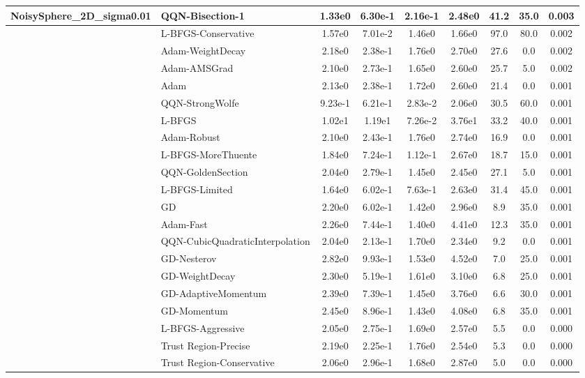 \documentclass{article}
\begin{document}
\begin{longtable}{|l|l|c|c|c|c|c|c|c|}
NoisySphere\_2D\_sigma0.01 & \textbf{QQN-Bisection-1} & 1.33e0 & 6.30e-1 & 2.16e-1 & 2.48e0 & 41.2 & 35.0 & 0.003 \\
\hline
 & L-BFGS-Conservative & 1.57e0 & 7.01e-2 & 1.46e0 & 1.66e0 & 97.0 & 80.0 & 0.002 \\
\hline
 & Adam-WeightDecay & 2.18e0 & 2.38e-1 & 1.76e0 & 2.70e0 & 27.6 & 0.0 & 0.002 \\
\hline
 & Adam-AMSGrad & 2.10e0 & 2.73e-1 & 1.65e0 & 2.60e0 & 25.7 & 5.0 & 0.002 \\
\hline
 & Adam & 2.13e0 & 2.38e-1 & 1.72e0 & 2.60e0 & 21.4 & 0.0 & 0.001 \\
\hline
 & QQN-StrongWolfe & 9.23e-1 & 6.21e-1 & 2.83e-2 & 2.06e0 & 30.5 & 60.0 & 0.001 \\
\hline
 & L-BFGS & 1.02e1 & 1.19e1 & 7.26e-2 & 3.76e1 & 33.2 & 40.0 & 0.001 \\
\hline
 & Adam-Robust & 2.10e0 & 2.43e-1 & 1.76e0 & 2.74e0 & 16.9 & 0.0 & 0.001 \\
\hline
 & L-BFGS-MoreThuente & 1.84e0 & 7.24e-1 & 1.12e-1 & 2.67e0 & 18.7 & 15.0 & 0.001 \\
\hline
 & QQN-GoldenSection & 2.04e0 & 2.79e-1 & 1.45e0 & 2.45e0 & 27.1 & 5.0 & 0.001 \\
\hline
 & L-BFGS-Limited & 1.64e0 & 6.02e-1 & 7.63e-1 & 2.63e0 & 31.4 & 45.0 & 0.001 \\
\hline
 & GD & 2.20e0 & 6.02e-1 & 1.42e0 & 2.96e0 & 8.9 & 35.0 & 0.001 \\
\hline
 & Adam-Fast & 2.26e0 & 7.44e-1 & 1.40e0 & 4.41e0 & 12.3 & 35.0 & 0.001 \\
\hline
 & QQN-CubicQuadraticInterpolation & 2.04e0 & 2.13e-1 & 1.70e0 & 2.34e0 & 9.2 & 0.0 & 0.001 \\
\hline
 & GD-Nesterov & 2.82e0 & 9.93e-1 & 1.53e0 & 4.52e0 & 7.0 & 25.0 & 0.001 \\
\hline
 & GD-WeightDecay & 2.30e0 & 5.19e-1 & 1.61e0 & 3.10e0 & 6.8 & 25.0 & 0.001 \\
\hline
 & GD-AdaptiveMomentum & 2.39e0 & 7.39e-1 & 1.45e0 & 3.76e0 & 6.6 & 30.0 & 0.001 \\
\hline
 & GD-Momentum & 2.45e0 & 8.96e-1 & 1.43e0 & 4.08e0 & 6.8 & 35.0 & 0.001 \\
\hline
 & L-BFGS-Aggressive & 2.05e0 & 2.75e-1 & 1.69e0 & 2.57e0 & 5.5 & 0.0 & 0.000 \\
\hline
 & Trust Region-Precise & 2.19e0 & 2.25e-1 & 1.76e0 & 2.54e0 & 5.3 & 0.0 & 0.000 \\
\hline
 & Trust Region-Conservative & 2.06e0 & 2.96e-1 & 1.68e0 & 2.87e0 & 5.0 & 0.0 & 0.000 \\

\end{longtable}
\end{document}
